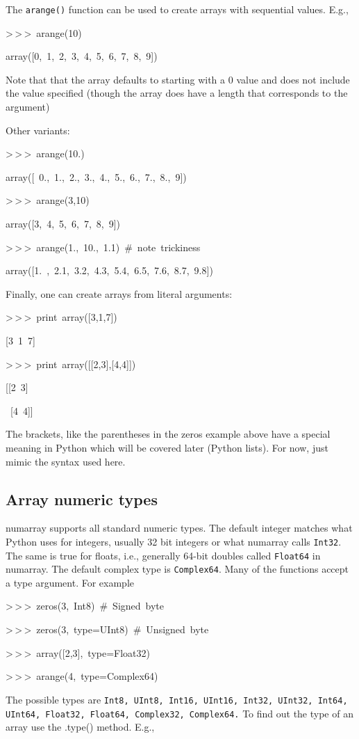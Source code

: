 The \texttt{arange()} function can be used to create arrays with sequential
values. E.g.,

\begin{lyxcode}
>\,{}>\,{}>~arange(10)

array({[}0,~1,~2,~3,~4,~5,~6,~7,~8,~9])
\end{lyxcode}
Note that that the array defaults to starting with a 0 value and does
not include the value specified (though the array does have a length
that corresponds to the argument)

Other variants:

\begin{lyxcode}
>\,{}>\,{}>~arange(10.)

array({[}~0.,~1.,~2.,~3.,~4.,~5.,~6.,~7.,~8.,~9])

>\,{}>\,{}>~arange(3,10)

array({[}3,~4,~5,~6,~7,~8,~9])

>\,{}>\,{}>~arange(1.,~10.,~1.1)~\#~note~trickiness

array({[}1.~,~2.1,~3.2,~4.3,~5.4,~6.5,~7.6,~8.7,~9.8])
\end{lyxcode}
Finally, one can create arrays from literal arguments:

\begin{lyxcode}
>\,{}>\,{}>~print~array({[}3,1,7])

{[}3~1~7]

>\,{}>\,{}>~print~array({[}{[}2,3],{[}4,4]])

{[}{[}2~3]

~{[}4~4]]
\end{lyxcode}
The brackets, like the parentheses in the zeros example above have
a special meaning in Python which will be covered later (Python lists).
For now, just mimic the syntax used here.


\subsection{Array numeric types}

numarray supports all standard numeric types. The default integer
matches what Python uses for integers, usually 32 bit integers or
what numarray calls \texttt{Int32}. The same is true for floats, i.e.,
generally 64-bit doubles called \texttt{Float64} in numarray. The
default complex type is \texttt{Complex64}. Many of the functions
accept a type argument. For example

\begin{lyxcode}
>\,{}>\,{}>~zeros(3,~Int8)~\#~Signed~byte

>\,{}>\,{}>~zeros(3,~type=UInt8)~\#~Unsigned~byte

>\,{}>\,{}>~array({[}2,3],~type=Float32)

>\,{}>\,{}>~arange(4,~type=Complex64)
\end{lyxcode}
The possible types are \texttt{Int8, UInt8, Int16, UInt16, Int32,
UInt32, Int64, UInt64, Float32, Float64, Complex32, Complex64.} To
find out the type of an array use the .type() method. E.g.,

